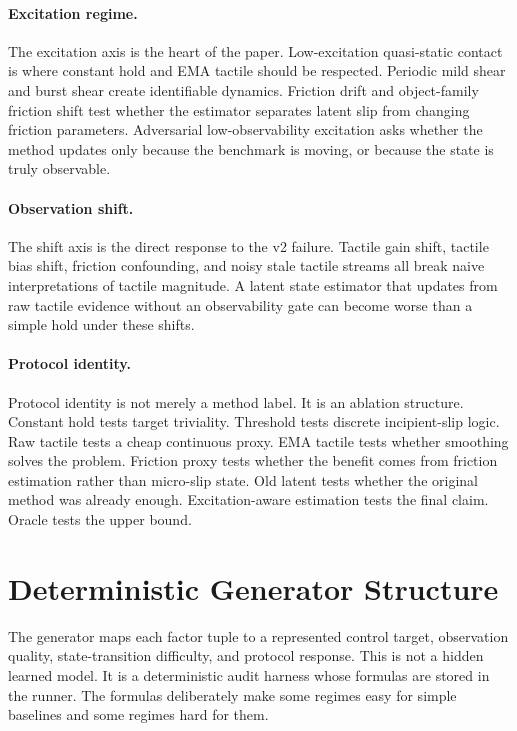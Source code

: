 \documentclass{article}
\begin{document}
\paragraph{Excitation regime.}
The excitation axis is the heart of the paper. Low-excitation quasi-static contact is where constant hold and EMA tactile should be respected. Periodic mild shear and burst shear create identifiable dynamics. Friction drift and object-family friction shift test whether the estimator separates latent slip from changing friction parameters. Adversarial low-observability excitation asks whether the method updates only because the benchmark is moving, or because the state is truly observable.

\paragraph{Observation shift.}
The shift axis is the direct response to the v2 failure. Tactile gain shift, tactile bias shift, friction confounding, and noisy stale tactile streams all break naive interpretations of tactile magnitude. A latent state estimator that updates from raw tactile evidence without an observability gate can become worse than a simple hold under these shifts.

\paragraph{Protocol identity.}
Protocol identity is not merely a method label. It is an ablation structure. Constant hold tests target triviality. Threshold tests discrete incipient-slip logic. Raw tactile tests a cheap continuous proxy. EMA tactile tests whether smoothing solves the problem. Friction proxy tests whether the benefit comes from friction estimation rather than micro-slip state. Old latent tests whether the original method was already enough. Excitation-aware estimation tests the final claim. Oracle tests the upper bound.

\section{Deterministic Generator Structure}

The generator maps each factor tuple to a represented control target, observation quality, state-transition difficulty, and protocol response. This is not a hidden learned model. It is a deterministic audit harness whose formulas are stored in the runner. The formulas deliberately make some regimes easy for simple baselines and some regimes hard for them.
\end{document}
